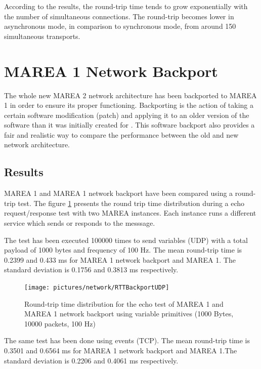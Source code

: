 According to the results, the round-trip time tends to grow exponentially with the number of simultaneous connections. The round-trip becomes lower in asynchronous mode, in comparison to synchronous mode, from around 150 simultaneous transports. 

\section{MAREA 1 Network Backport}\label{S:MAREA-1-Network-Backport}

The whole new MAREA 2 network architecture has been backported to MAREA 1 in order to ensure its proper functioning. Backporting is the action of taking a certain software modification (patch) and applying it to an older version of the software than it was initially created for \cite{cite:backporting}. This software backport also provides a fair and realistic  way to compare the performance between the old and new network architecture.

\subsection{Results}\label{SS:Backport-Results}

MAREA 1 and MAREA 1 network backport have been compared using a round-trip test. The figure \ref{fig:RRT-backport-UDP} presents the round trip time distribution during a echo request/response test with two MAREA instances. Each instance runs a different service which sends or responds to the messsage. 

The test has been executed 100000 times to send variables (UDP) with a total payload of 1000 bytes and frequency of 100 Hz. The mean round-trip time is 0.2399 and 0.433 ms for MAREA 1 network backport and MAREA 1. The standard deviation is 0.1756 and 0.3813 ms respectively.

\begin{figure}[H]\begin{center}
 \centering
  \captionsetup{justification=centering}
  \texttt{[image: pictures/network/RTTBackportUDP]}
  \caption{Round-trip time distribution for the echo test of MAREA 1 and MAREA 1 network backport using variable primitives (1000 Bytes, 10000 packets, 100 Hz) \label{fig:RRT-backport-UDP}}
\end{center}\end{figure}

The same test has been done using events (TCP). The mean round-trip time is 0.3501 and 0.6564 ms for MAREA 1 network backport and MAREA 1.The standard deviation is 0.2206 and 0.4061 ms respectively.




